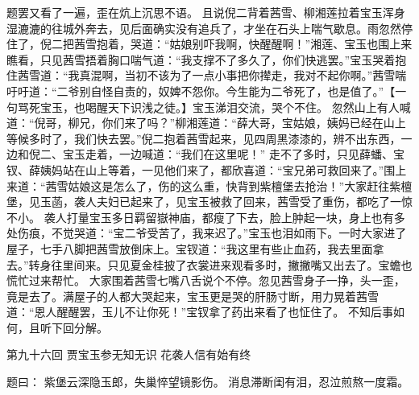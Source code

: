 \documentclass[12pt,oneside]{book}
\begin{document}
题罢又看了一遍，歪在炕上沉思不语。
且说倪二背着茜雪、柳湘莲拉着宝玉浑身湿漉漉的往城外奔去，见后面确实没有追兵了，才坐在石头上喘气歇息。雨忽然停住了，倪二把茜雪抱着，哭道：“姑娘别吓我啊，快醒醒啊！”湘莲、宝玉也围上来瞧看，只见茜雪捂着胸口喘气道：“我支撑不了多久了，你们快逃罢。”宝玉哭着抱住茜雪道：“我真混啊，当初不该为了一点小事把你撵走，我对不起你啊。”茜雪喘吁吁道：“二爷别自怪自责的，奴婢不怨你。今生能为二爷死了，也是值了。”【一句骂死宝玉，也喝醒天下识浅之徒。】宝玉涕泪交流，哭个不住。
忽然山上有人喊道：“倪哥，柳兄，你们来了吗？”柳湘莲道：“薛大哥，宝姑娘，姨妈已经在山上等候多时了，我们快去罢。”倪二抱着茜雪起来，见四周黑漆漆的，辨不出东西，一边和倪二、宝玉走着，一边喊道：“我们在这里呢！”
走不了多时，只见薛蟠、宝钗、薛姨妈站在山上等着，一见他们来了，都欣喜道：“宝兄弟可救回来了。”围上来道：“茜雪姑娘这是怎么了，伤的这么重，快背到紫檀堡去抢治！”大家赶往紫檀堡，见玉菡，袭人夫妇已起来了，见宝玉被救了回来，茜雪受了重伤，都吃了一惊不小。
袭人打量宝玉多日羁留嶽神庙，都瘦了下去，脸上肿起一块，身上也有多处伤痕，不觉哭道：“宝二爷受苦了，我来迟了。”宝玉也泪如雨下。一时大家进了屋子，七手八脚把茜雪放倒床上。宝钗道：“我这里有些止血药，我去里面拿去。”转身往里间来。只见夏金桂披了衣裳进来观看多时，撇撇嘴又出去了。宝蟾也慌忙过来帮忙。
大家围着茜雪七嘴八舌说个不停。忽见茜雪身子一挣，头一歪，竟是去了。满屋子的人都大哭起来，宝玉更是哭的肝肠寸断，用力晃着茜雪道：“恩人醒醒罢，玉儿不让你死！”宝钗拿了药出来看了也怔住了。
不知后事如何，且听下回分解。



 
第九十六回 贾宝玉参无知无识 花袭人信有始有终

题曰：
紫堡云深隐玉郎，失巢悴望镜影伤。
消息滞断闺有泪，忍泣煎熬一度霜。
\end{document}
